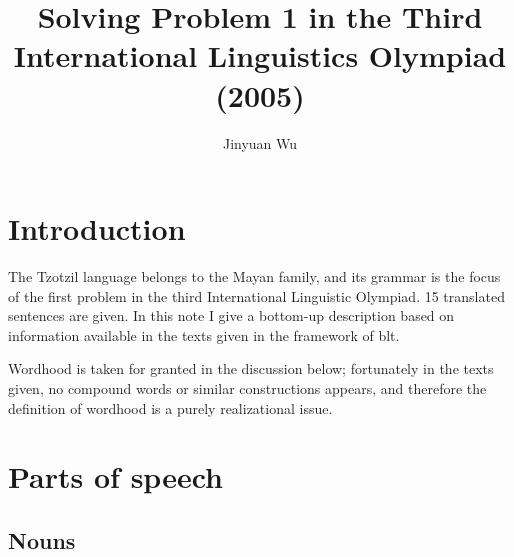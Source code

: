 \documentclass[12pt]{article}
\title{Solving Problem 1 in the Third International Linguistics Olympiad (2005)}
\author{Jinyuan Wu}
\begin{document}
\automath

\maketitle

\section{Introduction}

The Tzotzil language belongs to the Mayan family,
and its grammar is the focus of the first problem 
in the third International Linguistic Olympiad.
15 translated sentences are given.
In this note I give a bottom-up description 
based on information available in the texts given
in the framework of \ac{blt}.

Wordhood is taken for granted in the discussion below;
fortunately in the texts given,
no compound words or similar constructions appears, 
and therefore the definition of wordhood 
is a purely realizational issue.



\section{Parts of speech}

\subsection{Nouns}
\end{document}
